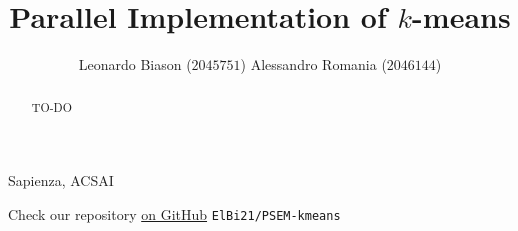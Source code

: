 \documentclass[11pt, journal]{IEEEtran}
\title{Parallel Implementation of $k$-means}
\author{Leonardo Biason ($2045751$) \quad Alessandro Romania ($2046144$)}
\newcommand{\nl}{

\medskip

}
\begin{document}
\maketitle

\begin{abstract}
    TO-DO
\end{abstract}

\begin{keywords}
    Sapienza, ACSAI
\end{keywords}
\nl
\begin{tcolorbox}[colback = Purple!20, colframe = Purple!40]
    \begin{center}
         Check our repository \href{https://www.github.com/ElBi21/PSEM-kmeans}{on GitHub}
        \verb|ElBi21/PSEM-kmeans|
    \end{center}
\end{tcolorbox}
\end{document}
